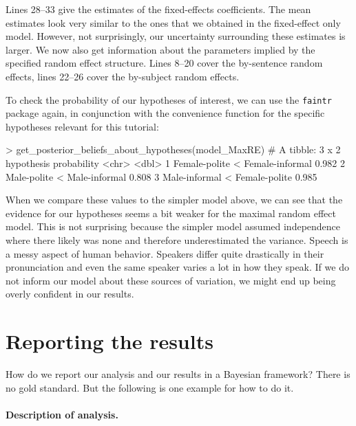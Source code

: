 \documentclass[nobib]{tufte-handout}
\begin{document}
\vspace{-0.5cm}

Lines 28--33 give the estimates of the fixed-effects coefficients. The mean estimates look very similar to the ones that we obtained in the fixed-effect only model. However, not surprisingly, our uncertainty surrounding these estimates is larger.  
We now also get information about the parameters implied by the specified random effect
structure. Lines 8--20 cover the by-sentence random effects, lines 22--26 cover the by-subject
random effects.

To check the probability of our hypotheses of interest, we can use the \texttt{faintr} package again, in conjunction with the convenience function for the specific hypotheses relevant for this tutorial:

\begin{minipage}[]{\textwidth}
\begin{rc}
> get_posterior_beliefs_about_hypotheses(model_MaxRE)
# A tibble: 3 x 2
  hypothesis                      probability
  <chr>                                 <dbl>
1 Female-polite < Female-informal       0.982
2 Male-polite < Male-informal           0.808
3 Male-informal < Female-polite         0.985
\end{rc}
\end{minipage}

\vspace{-0.5cm}

When we compare these values to the simpler model above, we can see that the evidence for our
hypotheses seems a bit weaker for the maximal random effect model. This is not surprising
because the simpler model assumed independence where there likely was none and therefore
underestimated the variance. Speech is a messy aspect of human behavior. Speakers differ quite
drastically in their pronunciation and even the same speaker varies a lot in how they speak.
If we do not inform our model about these sources of variation, we might end up being overly confident in our results.


\section{Reporting the results}
How do we report our analysis and our results in a Bayesian framework? There is no gold
standard. But the following is one example for how to do it.

\paragraph{Description of analysis.}
\end{document}
